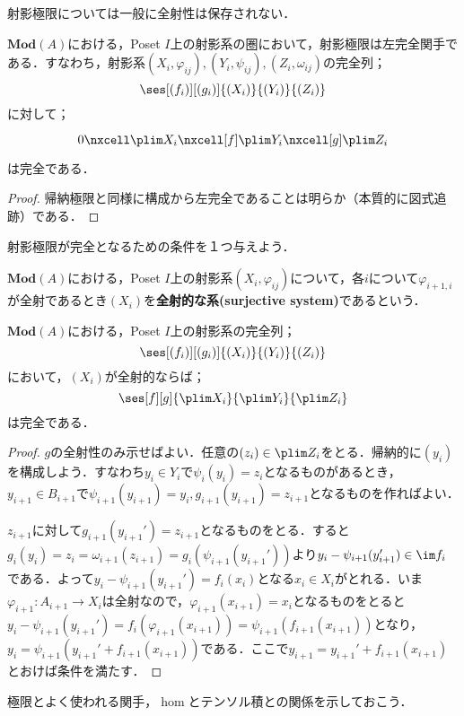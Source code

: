 射影極限については一般に全射性は保存されない．
\begin{prop}
	$\mathbf{Mod}(A)$における，Poset $I$上の射影系の圏において，射影極限は左完全関手である．すなわち，射影系$(X_i,\varphi_{ij}),(Y_i,\psi_{ij}),(Z_i,\omega_{ij})$の完全列；
	\[\ses[(f_i)][(g_i)]{(X_i)}{(Y_i)}{(Z_i)}\]
	に対して；
	\[\begin{tikzcd}
	0\nxcell \plim X_i\nxcell[f]\plim Y_i\nxcell[g]\plim Z_i
	\end{tikzcd}\]
	は完全である．
\end{prop}

\begin{proof}
	帰納極限と同様に構成から左完全であることは明らか（本質的に図式追跡）である．
\end{proof}

射影極限が完全となるための条件を１つ与えよう．
\begin{defi}[全射的な系]
	$\mathbf{Mod}(A)$における，Poset $I$上の射影系$(X_i,\varphi_{ij})$について，各$i$について$\varphi_{i+1,i}$が全射であるとき$(X_i)$を\textbf{全射的な系(surjective system)}であるという．
\end{defi}

\begin{thm}\label{thm:最初がsurjectiveなら射影極限は完全}
	$\mathbf{Mod}(A)$における，Poset $I$上の射影系の完全列；
	\[\ses[(f_i)][(g_i)]{(X_i)}{(Y_i)}{(Z_i)}\]
	において，$(X_i)$が全射的ならば；
	\[\ses[f][g]{\plim X_i}{\plim Y_i}{\plim Z_i}\]
	は完全である．
\end{thm}

\begin{proof}
	$g$の全射性のみ示せばよい．任意の$(z_i)\in\plim Z_i$をとる．帰納的に$(y_i)$を構成しよう．すなわち$y_i\in Y_i$で$\psi_i(y_i)=z_i$となるものがあるとき，$y_{i+1}\in B_{i+1}$で$\psi_{i+1}(y_{i+1})=y_i,g_{i+1}(y_{i+1})=z_{i+1}$となるものを作ればよい．
	
	$z_{i+1}$に対して$g_{i+1}(y_{i+1}')=z_{i+1}$となるものをとる．すると$g_i(y_i)=z_i=\omega_{i+1}(z_{i+1})=g_i(\psi_{i+1}(y_{i+1}'))$より$y_i-\psi_{i+1}(y_{i+1}')\in\im f_i$である．よって$y_i-\psi_{i+1}(y_{i+1}')=f_i(x_i)$となる$x_i\in X_i$がとれる．いま$\varphi_{i+1}:A_{i+1}\to X_i$は全射なので，$\varphi_{i+1}(x_{i+1})=x_i$となるものをとると$y_i-\psi_{i+1}(y_{i+1}')=f_i(\varphi_{i+1}(x_{i+1}))=\psi_{i+1}(f_{i+1}(x_{i+1}))$となり，$y_i=\psi_{i+1}(y_{i+1}'+f_{i+1}(x_{i+1}))$である．ここで$y_{i+1}=y_{i+1}'+f_{i+1}(x_{i+1})$とおけば条件を満たす．
\end{proof}

極限とよく使われる関手，$\hom$とテンソル積との関係を示しておこう．


